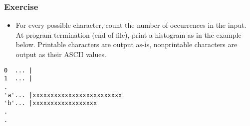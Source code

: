 \begin{frame}[fragile]
  \frametitle{Exercise}

  \begin{itemize}
  \item For every possible character, count the number of occurrences
    in the input. At program termination (end of file), print a
    histogram as in the example below. Printable characters are output
    as-is, nonprintable characters are output as their ASCII values.
  \end{itemize}

  \begin{block}{}
\begin{verbatim}
0  ... |
1  ... |
.
'a'... |xxxxxxxxxxxxxxxxxxxxxxxxx
'b'... |xxxxxxxxxxxxxxxxxx
.
.
\end{verbatim}
  \end{block}
  
\end{frame}
